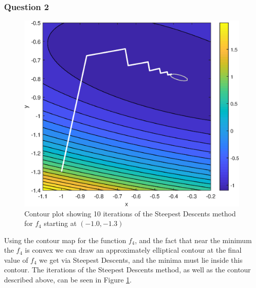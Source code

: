 \documentclass[11pt]{article} %
\let\originalleft\left
\let\originalright\right
\renewcommand{\left}{\mathopen{}\mathclose\bgroup\originalleft}
\renewcommand{\right}{\aftergroup\egroup\originalright}
\begin{document}
\subsubsection*{Question 2}
\begin{figure}[!h]
	\centering
	\includegraphics{"../Matlab Files/contour3"}
	\caption{Contour plot showing 10 iterations of the Steepest Descents method for $f_4$ starting at $(-1.0, -1.3)$}
	\label{fig:SD_10_iter}
\end{figure}
Using the contour map for the function $f_4$, and the fact that near the minimum the $f_4$ is convex we can draw an approximately elliptical contour at the final value of $f_4$ we get via Steepest Descents, and the minima must lie inside this contour. The iterations of the Steepest Descents method, as well as the contour described above, can be seen in Figure \ref{fig:SD_10_iter}.
\end{document}
